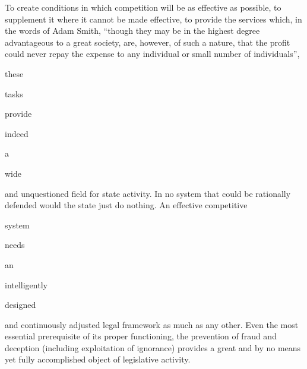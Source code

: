 \documentclass[11pt,openany]{book}
\begin{document}
To create conditions in which competition will be as effective as possible, to supplement it where it cannot be made effective, to provide the services which, in the words of Adam Smith, ``though they may be in the highest degree advantageous to a great society, are, however, of such a nature, that the profit could never repay the expense to any individual or small number of individuals'',

these

tasks

provide

indeed

a

wide

and unquestioned field for state activity. In no system that could be rationally defended would the state just do nothing. An effective competitive

system

needs

an

intelligently

designed

and continuously adjusted legal framework as much as any other. Even the most essential prerequisite of its proper functioning, the prevention of fraud and deception (including exploitation of ignorance) provides a great and by no means yet fully accomplished object of legislative activity.

\begin{center}\textasteriskcentered\hspace{0.9em}\textasteriskcentered\hspace{0.9em}\textasteriskcentered\end{center}

\begin{center}\textasteriskcentered\hspace{0.9em}\textasteriskcentered\hspace{0.9em}\textasteriskcentered\end{center}

\begin{center}\textasteriskcentered\hspace{0.9em}\textasteriskcentered\hspace{0.9em}\textasteriskcentered\end{center}

\begin{center}\textasteriskcentered\hspace{0.9em}\textasteriskcentered\hspace{0.9em}\textasteriskcentered\end{center}
\end{document}
